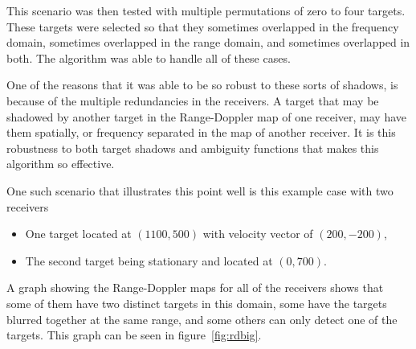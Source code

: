\documentclass[12pt,openany,a4paper]{book}
\begin{document}
\bigskip

This scenario was then tested with multiple permutations of zero to four targets. These targets were selected so that they sometimes overlapped in the frequency domain, sometimes overlapped in the range domain, and sometimes overlapped in both. The algorithm was able to handle all of these cases.

\bigskip

One of the reasons that it was able to be so robust to these sorts of shadows, is because of the multiple redundancies in the receivers. A target that may be shadowed by another target in the Range-Doppler map of one receiver, may have them spatially, or frequency separated in the map of another receiver. It is this robustness to both target shadows and ambiguity functions that makes this algorithm so effective.

\bigskip

One such scenario that illustrates this point well is this example case with two receivers
\begin{itemize}
\item{One target located at $(1100,500)$ with velocity vector of $(200,-200)$,}
\item{The second target being stationary and located at $(0,700)$.}
\end{itemize}

\bigskip

A graph showing the Range-Doppler maps for all of the receivers shows that some of them have two distinct targets in this domain, some have the targets blurred together at the same range, and some others can only detect one of the targets. This graph can be seen in figure~\ref{fig:rdbig}.
\end{document}
